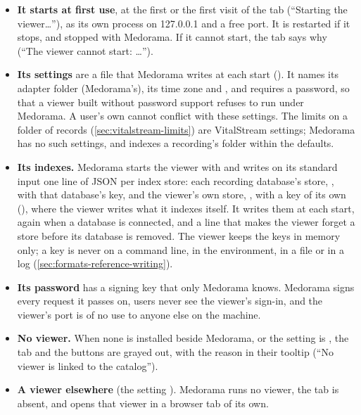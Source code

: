 \begin{itemize}
\item \textbf{It starts at first use}, at the first  or the first visit of the tab
  (``Starting the viewer\dots''), as its own process on 127.0.0.1 and a free port. It is
  restarted if it stops, and stopped with Medorama. If it cannot start, the tab says why
  (``The viewer cannot start: \dots'').
\item \textbf{Its settings} are a file that Medorama writes at each start
  (). It names its adapter folder (Medorama's), its time zone and , and requires a password, so that a viewer
  built without password support refuses to run under Medorama. A user's own  cannot conflict with
  these settings. The limits on a folder of records (\cref{sec:vitalstream-limits}) are
  VitalStream settings; Medorama has no such settings, and indexes a recording's folder within
  the defaults.
\item \textbf{Its indexes.} Medorama starts the viewer with  and writes on
  its standard input one line of JSON per index store: each recording database's store,
  , with that database's key, and the viewer's own store,
  , with a key of its own (), where the
  viewer writes what it indexes itself. It writes them at each start, again when a database is
  connected, and a line that makes the viewer forget a store before its database is removed. The
  viewer keeps the keys in memory only; a key is never on a command line, in the environment, in
  a file or in a log (\cref{sec:formats-reference-writing}).
\item \textbf{Its password} has a signing key that only Medorama knows. Medorama signs every
  request it passes on, users never see the viewer's sign-in, and the viewer's port is of
  no use to anyone else on the machine.
\item \textbf{No viewer.} When none is installed beside Medorama, or the setting is
  , the  tab and the  buttons are grayed out, with the
  reason in their tooltip (``No viewer is linked to the catalog'').
\item \textbf{A viewer elsewhere} (the setting ). Medorama runs no viewer,
  the tab is absent, and  opens that viewer in a browser tab of its own.
\end{itemize}

